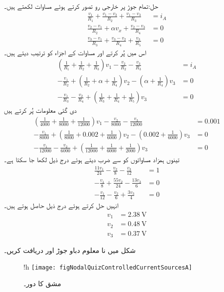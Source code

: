 حل:تمام جوڑ پر خارجی رو تصور کرتے ہوئے مساوات لکھتے ہیں۔
\begin{align*}
\frac{v_1}{R_1}+\frac{v_1-v_2}{R_2}+\frac{v_1-v_3}{R_3}&=i_A\\
\frac{v_2-v_1}{R_2}+\alpha v_x +\frac{v_2-v_3}{R_4}&=0\\
\frac{v_3-v_1}{R_3}+\frac{v_3-v_2}{R_4}+\frac{v_3}{R_5}&=0
\end{align*}
اس میں  پُر کرتے اور مساوات کے اجزاء کو ترتیب دیتے ہیں۔
\begin{align*}
\left(\frac{1}{R_1}+\frac{1}{R_2}+\frac{1}{R_3}\right)v_1-\frac{v_2}{R_2}-\frac{v_3}{R_3}&=i_A\\
-\frac{v_1}{R_2}+\left(\frac{1}{R_2}+\alpha+\frac{1}{R_4}\right)v_2-(\alpha+\frac{1}{R_4})v_3&=0\\
-\frac{v_1}{R_3}-\frac{v_2}{R_4}+\left(\frac{1}{R_3}+\frac{1}{R_4}+\frac{1}{R_5}\right)v_3&=0
\end{align*}
دی گئی معلومات پُر کرتے ہیں
\begin{align*}
\left(\frac{1}{4000}+\frac{1}{8000}+\frac{1}{12000}\right)v_1-\frac{v_2}{8000}-\frac{v_3}{12000}&=0.001\\
-\frac{v_1}{8000}+\left(\frac{1}{8000}+0.002+\frac{1}{6000}\right)v_2-(0.002+\frac{1}{6000})v_3&=0\\
-\frac{v_1}{12000}-\frac{v_2}{6000}+\left(\frac{1}{12000}+\frac{1}{6000}+\frac{1}{2000}\right)v_3&=0
\end{align*}
تینوں ہمزاد مساواتوں کو  سے ضرب دیتے ہوئے درج ذیل لکھا جا سکتا ہے۔
\begin{align*}
\frac{11v_1}{24}-\frac{v_2}{8}-\frac{v_3}{12}&=1\\
-\frac{v_1}{8}+\frac{55 v_2}{24}-\frac{13 v_3}{6}&=0\\
-\frac{v_1}{12}-\frac{v_2}{6}+\frac{3v_3}{4}&=0
\end{align*}
انہیں حل کرتے ہوئے درج ذیل حاصل ہوتے ہیں۔
\begin{align*}
v_1&=\SI{2.38}{\volt}\\
v_2&=\SI{0.48}{\volt}\\
v_3&=\SI{0.37}{\volt}
\end{align*}
\FloatBarrier

شکل  میں نا معلوم دباو جوڑ  اور  دریافت کریں۔ 
\begin{figure}{!h}
\centering
\texttt{[image: figNodalQuizControlledCurrentSourcesA]}
\caption{مشق  کا دور۔}
\label{شکل_مشق_جوڑ_تابع_منبع_رو_الف}
\end{figure}


